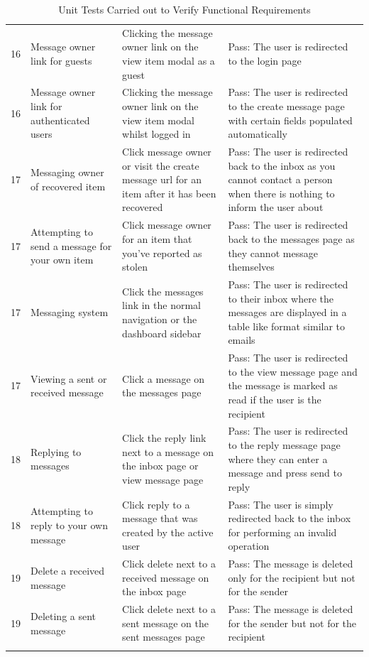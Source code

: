 \begin{longtable}{@{}p{}p{}p{}p{}@{}}
	16 & Message owner link for guests & Clicking the message owner link on the view item modal as a guest & \textcolor{PassGreen}{Pass}: The user is redirected to the login page \\
	
	16 & Message owner link for authenticated users & Clicking the message owner link on the view item modal whilst logged in & \textcolor{PassGreen}{Pass}: The user is redirected to the create message page with certain fields populated automatically \\
	
	17 & Messaging owner of recovered item & Click message owner or visit the create message  url for an item after it has been recovered & \textcolor{PassGreen}{Pass}: The user is redirected back to the inbox as you cannot contact a person when there is nothing to inform the user about \\
	
	17 & Attempting to send a message for your own item & Click message owner for an item that you've reported as stolen & \textcolor{PassGreen}{Pass}: The user is redirected back to the messages page as they cannot message themselves \\
	
	17 & Messaging system & Click the messages link in the normal navigation or the dashboard sidebar & \textcolor{PassGreen}{Pass}: The user is redirected to their inbox where the messages are displayed in a table like format similar to emails \\

	17 & Viewing a sent or received message & Click a message on the messages page & \textcolor{PassGreen}{Pass}: The user is redirected to the view message page and the message is marked as read if the user is the recipient \\
	
	18 & Replying to messages & Click the reply link next to a message on the inbox page or view message page & \textcolor{PassGreen}{Pass}: The user is redirected to the reply message page where they can enter a message and press send to reply \\
	
	18 & Attempting to reply to your own message & Click reply to a message that was created by the active user & \textcolor{PassGreen}{Pass}: The user is simply redirected back to the inbox for performing an invalid operation \\
	
	19 & Delete a received message & Click delete next to a received message on the inbox page & \textcolor{PassGreen}{Pass}: The message is deleted only for the recipient but not for the sender \\
	
	19 & Deleting a sent message & Click delete next to a sent message on the sent messages page & \textcolor{PassGreen}{Pass}: The message is deleted for the sender but not for the recipient \\ \bottomrule
	
	\caption{Unit Tests Carried out to Verify Functional Requirements}
	\label{table:Unit_Testing}
\end{longtable}


